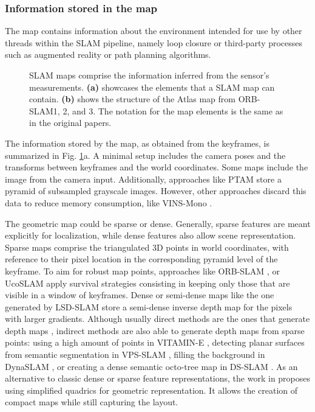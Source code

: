 \subsubsection{Information stored in the map}
\label{sec:backend:map}
The map contains information about the environment intended for use by other threads within the SLAM pipeline, namely loop closure or third-party processes such as augmented reality or path planning algorithms.


\begin{figure}[!b]
 \centering

 \quad
{}

\caption[The information in the SLAM's map]{SLAM maps comprise the information inferred from the sensor's measurements. \textbf{(a)} showcases the elements that a SLAM map can contain.  \textbf{(b)} shows the structure of the Atlas map from ORB-SLAM1, 2, and 3. The notation for the map elements is the same as in the original papers.}
\label{fig:atlasmap}
\centering
\end{figure}


The information stored by the map, as obtained from the keyframes, is summarized in Fig. \ref{fig:atlasmap}a.
A minimal setup includes the camera poses and the transforms between keyframes and the world coordinates. 
Some maps include the image from the camera input. Additionally, approaches like PTAM \cite{klein2007ptam} store a pyramid of subsampled grayscale images. However, other approaches discard this data to reduce memory consumption, like VINS-Mono \cite{qin2018vins-mono}.

The geometric map could be sparse or dense. Generally, sparse features are meant explicitly for localization, while dense features also allow scene representation. Sparse maps comprise the triangulated 3D points in world coordinates, with reference to their pixel location in the corresponding pyramid level of the keyframe. To aim for robust map points, approaches like ORB-SLAM \cite{campos2021orb}, or UcoSLAM \cite{munoz2020ucoslam} apply survival strategies consisting in keeping only those that are visible in a window of keyframes.
Dense or semi-dense maps like the one generated by LSD-SLAM \cite{engel2014lsd} store a semi-dense inverse depth map for the pixels with larger gradients. Although usually direct methods are the ones that generate depth maps \cite{engel2014lsd,tateno2017cnnslam,czarnowski2020deepfactors}, indirect methods are also able to generate depth maps from sparse points: using a high amount of points in VITAMIN-E  \cite{Yokozuka_2019vitamine}, detecting planar surfaces from semantic segmentation in VPS-SLAM \cite{bavle2020vps-slam}, filling the background in DynaSLAM \cite{dynaslam18}, or creating a dense semantic octo-tree map in DS-SLAM \cite{yu2018ds-slam}. 
As an alternative to classic dense or sparse feature representations, the work in \cite{zhen2021mapquadrics} proposes using simplified quadrics for geometric representation. It allows the creation of compact maps while still capturing the layout.

